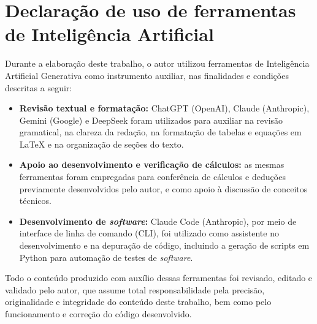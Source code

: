 \section{Declaração de uso de ferramentas de Inteligência Artificial}

Durante a elaboração deste trabalho, o autor utilizou ferramentas de
Inteligência Artificial Generativa como instrumento auxiliar, nas finalidades
e condições descritas a seguir:

\begin{itemize}
    \item \textbf{Revisão textual e formatação:} ChatGPT (OpenAI), Claude
    (Anthropic), Gemini (Google) e DeepSeek foram utilizados para auxiliar na
    revisão gramatical, na clareza da redação, na formatação de tabelas e
    equações em \LaTeX{} e na organização de seções do texto.

    \item \textbf{Apoio ao desenvolvimento e verificação de cálculos:} as mesmas
    ferramentas foram empregadas para conferência de cálculos e deduções
    previamente desenvolvidos pelo autor, e como apoio à discussão de conceitos
    técnicos.

    \item \textbf{Desenvolvimento de \textit{software}:} Claude Code (Anthropic), por meio
    de interface de linha de comando (CLI), foi utilizado como assistente no
    desenvolvimento e na depuração de código, incluindo a geração de scripts em
    Python para automação de testes de \textit{software}.
\end{itemize}

Todo o conteúdo produzido com auxílio dessas ferramentas foi revisado, editado
e validado pelo autor, que assume total responsabilidade pela precisão,
originalidade e integridade do conteúdo deste trabalho, bem como pelo
funcionamento e correção do código desenvolvido.
